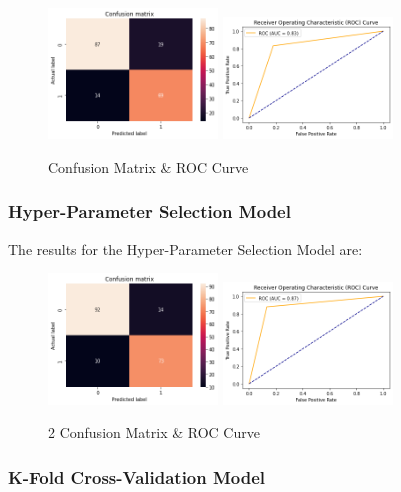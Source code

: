 \documentclass[conference]{IEEEtran}
\begin{document}
\begin{figure}[h!]
    \includegraphics[width=4.5cm]{k-NN/k1_1.png}%
    \includegraphics[width=4.5cm]{k-NN/k1_2.png}%
    \caption{Confusion Matrix & ROC Curve}%
    \label{fig:conf_KNN_1}%
\end{figure}

\subsubsection{Hyper-Parameter Selection Model}

The results for the Hyper-Parameter Selection Model are:

\begin{figure}[h!]
    \includegraphics[width=4.5cm]{k-NN/k2_1.png}%
    \includegraphics[width=4.5cm]{k-NN/k2_2.png}%
    \caption{2 Confusion Matrix & ROC Curve}%
    \label{fig:conf_KNN_2}%
\end{figure}

\subsubsection{K-Fold Cross-Validation Model}
\end{document}
